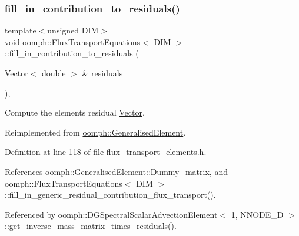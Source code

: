\subsubsection{\texorpdfstring{fill\+\_\+in\+\_\+contribution\+\_\+to\+\_\+residuals()}{fill\_in\_contribution\_to\_residuals()}}
{\footnotesize\ttfamily template$<$unsigned D\+IM$>$ \\
void \hyperlink{classoomph_1_1FluxTransportEquations}{oomph\+::\+Flux\+Transport\+Equations}$<$ D\+IM $>$\+::fill\+\_\+in\+\_\+contribution\+\_\+to\+\_\+residuals (\begin{DoxyParamCaption}\item[{\hyperlink{classoomph_1_1Vector}{Vector}$<$ double $>$ \&}]{residuals }\end{DoxyParamCaption})\hspace{0.3cm}{\ttfamily [inline]}, {\ttfamily [virtual]}}



Compute the element\textquotesingle{}s residual \hyperlink{classoomph_1_1Vector}{Vector}. 



Reimplemented from \hyperlink{classoomph_1_1GeneralisedElement_a310c97f515e8504a48179c0e72c550d7}{oomph\+::\+Generalised\+Element}.



Definition at line 118 of file flux\+\_\+transport\+\_\+elements.\+h.



References oomph\+::\+Generalised\+Element\+::\+Dummy\+\_\+matrix, and oomph\+::\+Flux\+Transport\+Equations$<$ D\+I\+M $>$\+::fill\+\_\+in\+\_\+generic\+\_\+residual\+\_\+contribution\+\_\+flux\+\_\+transport().



Referenced by oomph\+::\+D\+G\+Spectral\+Scalar\+Advection\+Element$<$ 1, N\+N\+O\+D\+E\+\_\+D $>$\+::get\+\_\+inverse\+\_\+mass\+\_\+matrix\+\_\+times\+\_\+residuals().

\mbox{\label{classoomph_1_1FluxTransportEquations_a6994eab818eb7236e24e45b6fedec1f7}} 
